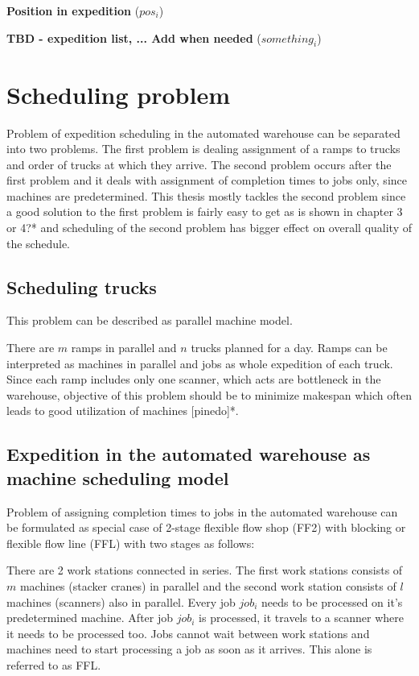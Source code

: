 \documentclass{ctuthesis}
\begin{document}
\noindent \textbf{Position in expedition} ($pos_i$)

\noindent \textbf{TBD - expedition list, ... Add when needed} ($something_i$)


\section{Scheduling problem}
 
 Problem of expedition scheduling in the automated warehouse can be separated into two problems. The first problem is dealing assignment of a ramps to trucks and order of trucks at which they arrive. The second problem occurs after the first problem and it deals with assignment of completion times to jobs only, since machines are predetermined. This thesis mostly tackles the second problem since a good solution to the first problem is fairly easy to get as is shown in chapter 3 or 4?* and scheduling of the second problem has bigger effect on overall quality of the schedule.
 
 \subsection{Scheduling trucks}
 
 This problem can be described as parallel machine model.
 
 There are $m$ ramps in parallel and $n$ trucks planned for a day. Ramps can be interpreted as machines in parallel and jobs as whole expedition of each truck. Since each ramp includes only one scanner, which acts are bottleneck in the warehouse, objective of this problem should be to minimize makespan which often leads to good utilization of machines [pinedo]*.
 
\subsection{Expedition in the automated warehouse as machine scheduling model}

Problem of assigning completion times to jobs in the automated warehouse can be formulated as special case of 2-stage flexible flow shop (FF2) with blocking or flexible flow line (FFL) with two stages as follows:

There are 2 work stations connected in series. The first work stations consists of $m$ machines (stacker cranes) in parallel and the second work station consists of $l$ machines (scanners) also in parallel. Every job $job_i$ needs to be processed on it's predetermined machine. After job $job_i$ is processed, it travels to a scanner where it needs to be processed too. Jobs cannot wait between work stations and machines need to start processing a job as soon as it arrives. This alone is referred to as FFL.
\end{document}
